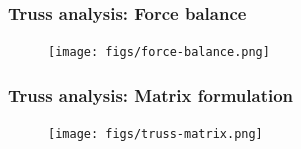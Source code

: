 \documentclass[notes]{beamer}
\begin{document}
\begin{frame}
	\frametitle{Truss analysis: Force balance}
	\begin{figure}[ht]
		\centering
		\texttt{[image: figs/force-balance.png]}
	\end{figure}
\end{frame}

\begin{frame}
	\frametitle{Truss analysis: Matrix formulation}
	\begin{figure}[ht]
		\centering
		\texttt{[image: figs/truss-matrix.png]}
	\end{figure}
\end{frame}
\end{document}

